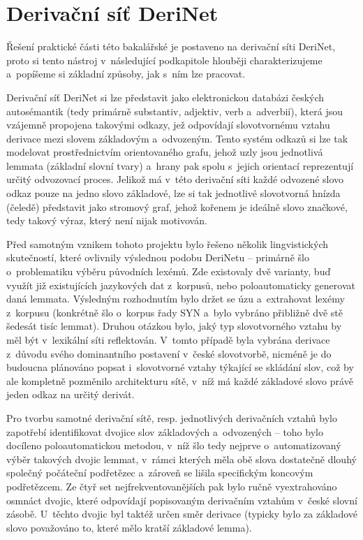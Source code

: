 \hypertarget{derivaux10dnuxed-suxedux165-derinet}{%
\section{Derivační síť
DeriNet}\label{derivaux10dnuxed-suxedux165-derinet}}

Řešení praktické části této bakalářské je postaveno na derivační síti
DeriNet, proto si tento nástroj v~následující podkapitole hlouběji
charakterizujeme a~popíšeme si základní způsoby, jak s~ním lze pracovat.

Derivační síť DeriNet si lze představit jako elektronickou databázi
českých autosémantik (tedy primárně substantiv, adjektiv, verb
a~adverbií), která jsou vzájemně propojena takovými odkazy, jež odpovídají
slovotvornému vztahu derivace mezi slovem základovým a~odvozeným. Tento
systém odkazů si lze tak modelovat prostřednictvím orientovaného grafu,
jehož uzly jsou jednotlivá lemmata (základní slovní tvary) a~hrany pak
spolu s~jejich orientací reprezentují určitý odvozovací proces. Jelikož
má v~této derivační síti každé odvozené slovo odkaz pouze na jedno slovo
základové, lze si tak jednotlivé slovotvorná hnízda (čeledě) představit
jako stromový graf, jehož kořenem je ideálně slovo značkové, tedy takový
výraz, který není nijak motivován. \parencite{derinet-cz}

Před samotným vznikem tohoto projektu bylo řešeno několik lingvistických
skutečností, které ovlivnily výslednou podobu DeriNetu -- primárně šlo
o~problematiku výběru původních lexémů. Zde existovaly dvě varianty, buď
využít již existujících jazykových dat z~korpusů, nebo poloautomaticky
generovat daná lemmata. Výsledným rozhodnutím bylo držet se úzu
a~extrahovat lexémy z~korpusu (konkrétně šlo o~korpus řady SYN a~bylo
vybráno přibližně dvě stě šedesát tisíc lemmat). Druhou otázkou bylo,
jaký typ slovotvorného vztahu by měl být v~lexikální síti reflektován.
V~tomto případě byla vybrána derivace z~důvodu svého dominantního
postavení v~české slovotvorbě, nicméně je do budoucna plánováno popsat
i~slovotvorné vztahy týkající se skládání slov, což by ale kompletně
pozměnilo architekturu sítě, v~níž má každé základové slovo právě jeden
odkaz na určitý derivát. \parencite{sevcikova14}

Pro tvorbu samotné derivační sítě, resp. jednotlivých derivačních vztahů
bylo zapotřebí identifikovat dvojice slov základových a~odvozených --
toho bylo docíleno poloautomatickou metodou, v~níž šlo tedy nejprve
o~automatizovaný výběr takových dvojic lemmat, v~rámci kterých měla obě
slova dostatečně dlouhý společný počáteční podřetězec a~zároveň se
lišila specifickým koncovým podřetězcem. Ze čtyř set
nejfrekventovanějších pak bylo ručně vyextrahováno osmnáct dvojic, které
odpovídají popisovaným derivačním vztahům v~české slovní zásobě.
U~těchto dvojic byl taktéž určen směr derivace (typicky bylo za základové
slovo považováno to, které mělo kratší základové lemma).
\parencite{derinet-cz}

